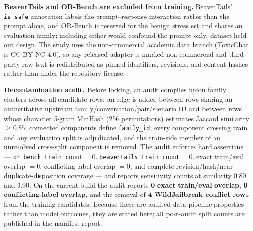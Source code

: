 \documentclass[sigconf,nonacm]{acmart}
\begin{document}
\textbf{BeaverTails and OR-Bench are excluded from training.} BeaverTails' \texttt{is\_safe} annotation labels the prompt--response interaction rather than the prompt alone, and OR-Bench is reserved for the benign stress set and shares an evaluation family; including either would confound the prompt-only, dataset-held-out design. The study uses the non-commercial academic data branch (ToxicChat is CC BY-NC 4.0), so any released adapter is marked non-commercial and third-party raw text is redistributed as pinned identifiers, revisions, and content hashes rather than under the repository license.

\textbf{Decontamination audit.} Before locking, an audit compiles union family clusters across all candidate rows: an edge is added between rows sharing an authoritative upstream family/conversation/pair/scenario ID and between rows whose character 5-gram MinHash (256 permutations) estimates Jaccard similarity $\ge 0.85$; connected components define \texttt{family\_id}; every component crossing train and any evaluation split is adjudicated, and the train-side member of an unresolved cross-split component is removed. The audit enforces hard assertions --- \texttt{or\_bench\_train\_count}$=0$, \texttt{beavertails\_train\_count}$=0$, exact train/eval overlap $=0$, conflicting-label overlap $=0$, and complete revision/hash/near-duplicate-disposition coverage --- and reports sensitivity counts at similarity 0.80 and 0.90. On the current build the audit reports \textbf{0 exact train/eval overlap}, \textbf{0 conflicting-label overlap}, and the removal of \textbf{4 WildJailbreak conflict rows} from the training candidates. Because these are audited data-pipeline properties rather than model outcomes, they are stated here; all post-audit split counts are published in the manifest report.
\end{document}
